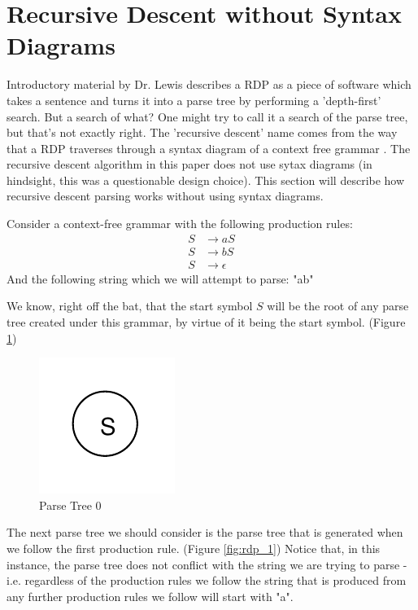 \documentclass[11pt]{article}
\begin{document}
\section{Recursive Descent without Syntax Diagrams}
\label{rd_wo_sd}
Introductory material by Dr. Lewis \cite{lewis} describes a RDP as a piece of software which takes 
a sentence and turns it into a parse tree by performing a 'depth-first' search. 
But a search of what? One might try to call it a search of the parse tree, but that's not exactly right.
The 'recursive descent' name comes from the way that a RDP traverses through a
syntax diagram of a context free grammar \cite{compiler}.
The recursive descent algorithm in this paper does not use sytax diagrams (in hindsight,
this was a questionable design choice). This section will describe
how recursive descent parsing works without using syntax diagrams.

Consider a context-free grammar with the following production rules:
\setcounter{equation}{0}
\begin{align}
S &\rightarrow a S\\
S &\rightarrow b S\\
S &\rightarrow \epsilon
\end{align}
And the following string which we will attempt to parse: "ab"

We know, right off the bat, that the start symbol $S$ will be the root of any parse tree created under this
grammar, by virtue of it being the start symbol. (Figure \ref{fig:rdp_0})

\begin{figure}[h!]
    \centering
    \includegraphics[natwidth=15,natheight=15]{rdp_0.pdf}
    \caption{Parse Tree 0}
    \label{fig:rdp_0}
\end{figure}

The next parse tree we should consider is the parse tree that is generated when we follow the first 
production rule. (Figure \ref{fig:rdp_1}) Notice that, in this instance, the parse tree does not conflict with
the string we are trying to parse - i.e. regardless of the production rules we follow the string that is
produced from any further production rules we follow will start with "a".
\end{document}
